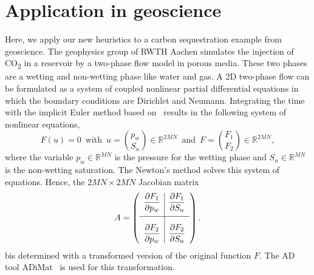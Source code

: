\documentclass[12pt, twoside,a4paper,toc=bibliography]{scrbook}
\newcommand{\field}[1]{\mathbb{#1}}
\newcommand{\R}{\ensuremath{\field{R}}}
\begin{document}



\clearpage
\section{Application in geoscience}
\label{s.application}
Here, we apply our new heuristics to a carbon sequestration example from geoscience.
The geophysics group of RWTH Aachen simulates the injection of CO\textsubscript{2}
in a reservoir by a two-phase flow model in porous media. These two phases are a wetting
and non-wetting phase like water and gas. A 2D two-phase flow can be formulated as
a system of coupled nonlinear partial differential equations in which the boundary conditions
are Dirichlet and Neumann. Integrating the time with the implicit Euler method
based on~\cite{Busing2014UEJ,Lulfesmann2012Fap} results in the following system of nonlinear equations,
$$F(u)=0 \, \text{ with } \, u = \binom{p_w}{S_n} \in \R^{2MN} \, \text{ and } \, F = \binom{F_1}{F_2} \in \R^{2MN},$$
where the variable $p_w \in \R^{MN}$ is the pressure for the wetting phase and $S_n \in \R^{MN}$ is the non-wetting saturation. The Newton's method solves this system of equations.
Hence, the $2MN \times 2MN$ Jacobian matrix 
$$
A =
\left({\begin{array}{l|l}
	\displaystyle \frac{\partial F_1}{\partial p_w} & \displaystyle \frac{\partial F_1}{\partial S_n} \\[1em]
	\hline
	\displaystyle \frac{\partial F_2}{\partial p_w} \rule[-7.5pt]{0pt}{30pt} & \displaystyle \frac{\partial F_2}{\partial S_n} \\
 \end{array}} \right).
$$
bis determined with a transformed version of the original function $F$. The AD tool \mbox{ADiMat}~\cite{Bischof2002CST,Willkomm2014ANU} is used for this transformation.
\end{document}
